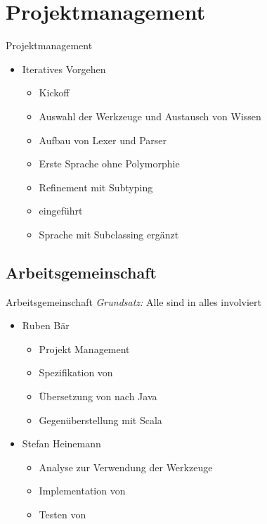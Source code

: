 \section{Projektmanagement}
\begin{frame}[t]{Projektmanagement}
	\begin{itemize}[<+->]
		\item Iteratives Vorgehen
		\begin{itemize}[<+->]
			\item Kickoff
			\item Auswahl der Werkzeuge und Austausch von Wissen
			\item Aufbau von Lexer und Parser
			\item Erste Sprache ohne Polymorphie
			\item Refinement mit Subtyping
			\item \mytype eingeführt
			\item Sprache mit Subclassing ergänzt
		\end{itemize}
	\end{itemize}
\end{frame}

\subsection{Arbeitsgemeinschaft}
\begin{frame}[t]{Arbeitsgemeinschaft}
	\emph{Grundsatz:} Alle sind in alles involviert
	\begin{itemize}
		\item Ruben Bär
		\begin{itemize}
			\item Projekt Management
			\item Spezifikation von \ooplss
			\item Übersetzung von \ooplss nach Java
			\item Gegenüberstellung mit Scala
		\end{itemize}
		\item Stefan Heinemann
		\begin{itemize}
			\item Analyse zur Verwendung der Werkzeuge
			\item Implementation von \ooplss
			\item Testen von \ooplss
		\end{itemize}
	\end{itemize}
\end{frame}
